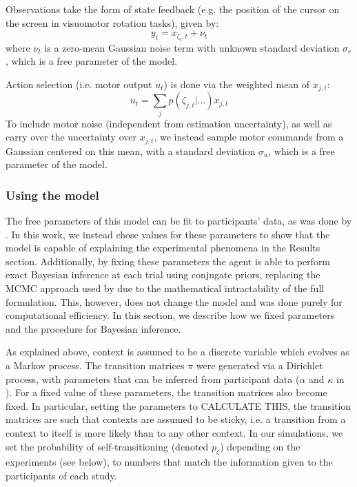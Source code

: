 \documentclass[a4paper,doc,floatsintext,natbib]{apa6}%
\begin{document}
Observations take the form of state feedback (e.g. the position of the cursor on the screen in visuomotor rotation tasks), given by:
\begin{equation}
y_t = x_{\zeta_t, t} + \nu_t
\end{equation}
where $\nu_t$ is a zero-mean Gaussian noise term with unknown standard deviation $\sigma_r$, which is a free parameter of the model.

Action selection (i.e. motor output $u_t$) is done via the weighted mean of $x_{j,t}$:
\begin{equation}
u_t  = \displaystyle\sum_{j}p(\zeta_{j,t} | ...) x_{j,t}
\end{equation}
To include motor noise (independent from estimation uncertainty), as well as carry over the uncertainty over $x_{j,t}$, we instead sample motor commands from a Gaussian centered on this mean, with a standard deviation $\sigma_u$, which is a free parameter of the model.


\subsubsection{Using the model}
The free parameters of this model can be fit to participants' data, as was done by \cite{Heald_Contextual_2021}. In this work, we instead chose values for these parameters to show that the model is capable of explaining the experimental phenomena in the Results section. Additionally, by fixing these parameters the agent is able to perform exact Bayesian inference at each trial using conjugate priors, replacing the MCMC approach used by \cite{Heald_Contextual_2021} due to the mathematical intractability of the full formulation. This, however, does not change the model and was done purely for computational efficiency. In this section, we describe how we fixed parameters and the procedure for Bayesian inference.

As explained above, context is assumed to be a discrete variable which evolves as a Markov process. The transition matrices $\pi$ were generated via a Dirichlet process, with parameters that can be inferred from participant data ($\alpha$ and $\kappa$ in \cite{Heald_Contextual_2021}). For a fixed value of these parameters, the transition matrices also become fixed. In particular, setting the parameters to CALCULATE THIS, the transition matrices are such that contexts are assumed to be sticky, i.e. a transition from a context to itself is more likely than to any other context. In our simulations, we set the probability of self-transitioning (denoted $p_\zeta$) depending on the experiments (see below), to numbers that match the information given to the participants of each study.
\end{document}

